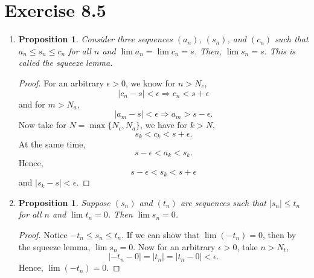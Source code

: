 \documentclass{article}
\newtheorem{proposition}[thm]{Proposition}
\begin{document}
\section*{Exercise 8.5}
\begin{enumerate}[label=(\alph*)]
    \item 
    \begin{proposition}
        Consider three sequences $(a_n)$, $(s_n)$, and $(c_n)$ such that $a_n \leq s_n \leq c_n$ 
        for all $n$ and $\lim a_n = \lim c_n = s$. Then, $\lim s_n = s$. This is called the 
        \textit{squeeze lemma}.
    \end{proposition}
    \begin{proof}
        For an arbitrary $\epsilon>0$, we know for $n > N_c$, $$|c_n-s|<\epsilon\Rightarrow 
        c_n<s+\epsilon$$ and for $m>N_a$, $$|a_m-s|<\epsilon\Rightarrow a_m>s-\epsilon.$$ 
        Now take for $N = \max\{N_c, N_a\}$, we have for $k>N$, $$s_k<c_k<s+
        \epsilon.$$ At the same time, $$s-\epsilon<a_k<s_k.$$ Hence, 
        $$s-\epsilon < s_k < s + \epsilon$$ and $|s_k-s| < \epsilon.$
    \end{proof}
    \item 
    \begin{proposition}
        Suppose $(s_n)$ and $(t_n)$ are sequences such that $|s_n| \leq t_n$ for all $n$ and 
        $\lim t_n = 0$. Then $\lim s_n = 0$.
    \end{proposition}
    \begin{proof}
        Notice $-t_n\le s_n\le t_n$. If we can show that $\lim (-t_n) = 0$, then by the squeeze 
        lemma, $\lim s_n = 0$. Now for an arbitrary $\epsilon>0$, take $n>N_t$, 
        $$|-t_n-0| = |t_n| = |t_n - 0|<\epsilon.$$ Hence, $\lim (-t_n) = 0$.
    \end{proof}
\end{enumerate}
\end{document}
